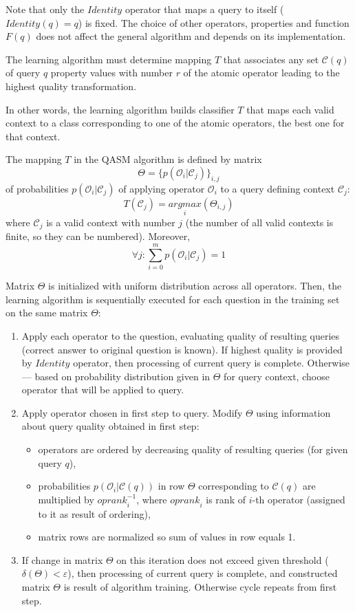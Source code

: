 \documentclass{article}
\begin{document}
Note that only the $Identity$ operator that maps a query to itself
($Identity(q)=q$) is fixed. The choice of other operators, properties and
function $F(q)$ does not affect the general algorithm and depends on its
implementation.

The learning algorithm must determine mapping $T$ that
associates any set
$\mathcal{C}(q)$ of query $q$ property values
with number $r$ of the atomic operator
leading to the highest quality transformation.

In other words, the learning algorithm builds classifier $T$
that maps each valid context to
a class corresponding to one of the atomic operators, the best one for that context.

The mapping $T$ in the QASM algorithm is defined by matrix
$$\Theta = \{p(\mathcal{O}_i|\mathcal{C}_j)\}_{i,j}$$
of probabilities $p(\mathcal{O}_i|\mathcal{C}_j)$
of applying operator $\mathcal{O}_i$ to a query defining context $\mathcal{C}_j$:
\[
T(\mathcal{C}_j)=\underset{i}{argmax}(\Theta_{i,j})
\]
where $\mathcal{C}_j$ is a valid context with number $j$
(the number of all valid contexts is finite, so they can be numbered).
Moreover, $$\forall j : \sum_{i=0}^m p(\mathcal{O}_i|\mathcal{C}_j)=1$$

Matrix $\Theta$ is initialized with uniform distribution
across all operators. Then,
the learning algorithm is sequentially executed for each question
in the training set on the same matrix $\Theta$:
\begin{enumerate}
\item
Apply each operator to the question, evaluating quality of
resulting queries (correct answer to original question is known).
If highest quality is provided by $Identity$ operator,
then processing of current query is complete.
Otherwise --- based on probability distribution given in $\Theta$ for
query context,
choose operator that will be applied to query.

\item
Apply operator chosen in first step to query.
Modify $\Theta$ using information about query quality
obtained in first step:
\begin{itemize}
\item operators are ordered by decreasing quality of resulting
      queries (for given query $q$),
\item probabilities $p(\mathcal{O}_i|\mathcal{C}(q))$
      in row $\Theta$ corresponding to $\mathcal{C}(q)$
      are multiplied by $\mathit{oprank}_{i}^{-1}$,
     where $\mathit{oprank}_i$ is rank of $i$-th operator
     (assigned to it as result of ordering),
\item matrix rows are normalized so sum of values in row
      equals 1.
\end{itemize}
\item
If change in matrix $\Theta$ on this iteration does not exceed given threshold
($\delta(\Theta) < \varepsilon$), then processing of current query
is complete, and constructed matrix $\Theta$ is result of algorithm training.
Otherwise cycle repeats from first step.
\end{enumerate}
\end{document}

